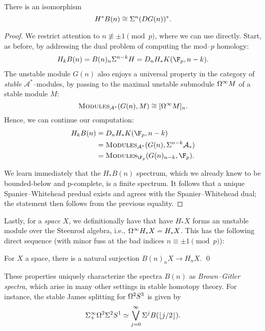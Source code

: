 \begin{theorem}
There is an isomorphism \[H^* B(n) \cong \Sigma^n(DG(n))^*.\]
\end{theorem}
\begin{proof}
We restrict attention to \(n \not\equiv \pm 1 \pmod p\), where we can use  directly.  Start, as before, by addressing the dual problem of computing the mod--\(p\) homology:
\begin{align*}
H_k B(n) = B(n)_n \Susp^{n-k} H = D_n H_* K(\F_p, n-k).
\end{align*}
The unstable module \(G(n)\) also enjoys a universal property in the category of \emph{stable} \(\mathcal A^*\)--modules, by passing to the maximal unstable submodule \(\Omega^\infty M\) of a stable module \(M\): \[\normalfont\textsc{Modules}_{\mathcal A^*}(G(n), M) \cong [\Omega^\infty M]_n.\]  Hence, we can continue our computation:
\begin{align*}
H_k B(n) & = D_n H_* K(\F_p, n-k) \\
& = \CatOf{Modules}_{\mathcal A^*}(G(n), \Susp^{n-k} \mathcal A_*) \\
& = \CatOf{Modules}_{\F_p}(G(n)_{n-k}, \F_p).
\end{align*}

We learn immediately that the \(H_* B(n)\) spectrum, which we already knew to be bounded-below and p-complete, is a finite spectrum.  It follows that a unique Spanier--Whitehead predual exists and agrees with the Spanier--Whitehead dual; the statement then follows from the previous equality.
\end{proof}

Lastly, for a \emph{space} \(X\), we definitionally have that have \(H_* X\) forms an unstable module over the Steenrod algebra, i.e., \(\Omega^\infty H_* X = H_* X\).  This has the following direct sequence (with minor fuss at the bad indices \(n \equiv \pm 1 \pmod p\)):

\begin{lemma}
For \(X\) a space, there is a natural surjection \(B(n)_n X \to H_n X\). \qed
\end{lemma}

\begin{remark}
These properties uniquely characterize the spectra \(B(n)\) as \textit{Brown--Gitler spectra}, which arise in many other settings in stable homotopy theory.  For instance, the stable James splitting for \(\Omega^2 S^3\) is given by \[\Sigma^\infty_+ \Omega^2 \Sigma^2 S^1 \simeq \bigvee_{j=0}^\infty \Sigma^j B(\lfloor j/2 \rfloor).\]
\end{remark}










